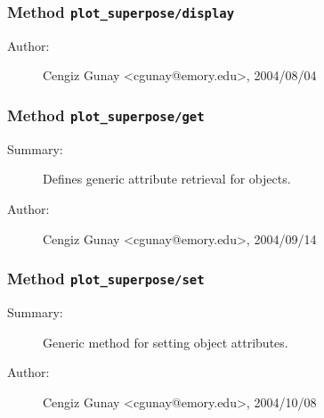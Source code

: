 \subsubsection[Method \texttt{display}]{Method \texttt{plot\_superpose/display}}%
%
\label{ref_plot_superpose__display}%
\hypertarget{ref_plot_superpose__display}{}%
\begin{description}
%
%
%
%
%
%
%
\item[Author:]%
Cengiz Gunay <cgunay@emory.edu>, 2004/08/04%
\end{description}
\methodline%
\subsubsection[Method \texttt{get}]{Method \texttt{plot\_superpose/get}}%
%
\label{ref_plot_superpose__get}%
\hypertarget{ref_plot_superpose__get}{}%
\begin{description}
\item[Summary:]Defines generic attribute retrieval for objects.
%
%
%
%
%
%
%
\item[Author:]%
Cengiz Gunay <cgunay@emory.edu>, 2004/09/14%
\end{description}
\methodline%
\subsubsection[Method \texttt{set}]{Method \texttt{plot\_superpose/set}}%
%
\label{ref_plot_superpose__set}%
\hypertarget{ref_plot_superpose__set}{}%
\begin{description}
\item[Summary:]Generic method for setting object attributes.
%
%
%
%
%
%
%
\item[Author:]%
Cengiz Gunay <cgunay@emory.edu>, 2004/10/08%
\end{description}
\methodline%

